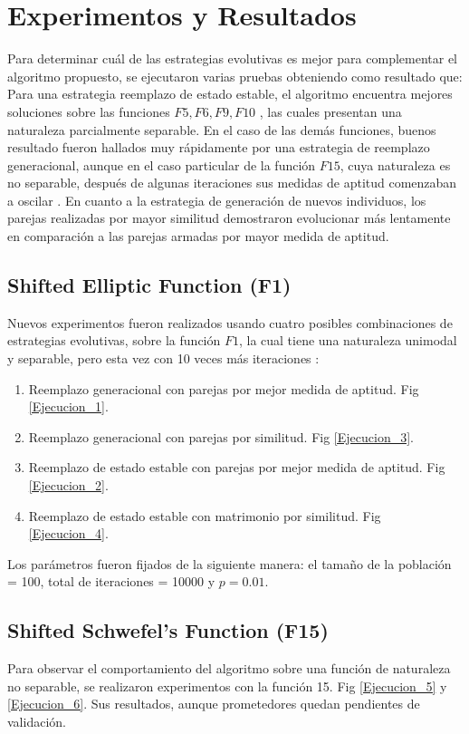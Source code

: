 \documentclass{llncs}
\begin{document}
\section{Experimentos y Resultados}
Para determinar cuál de las estrategias evolutivas es mejor para complementar el algoritmo propuesto, se ejecutaron varias pruebas obteniendo como resultado que:
Para una estrategia reemplazo de estado estable, el algoritmo encuentra mejores soluciones sobre las funciones ${F5,F6,F9,F10}$  \cite{IEEE:CEC}, las cuales presentan una naturaleza parcialmente separable.  En el caso de las demás funciones, buenos resultado fueron hallados muy rápidamente por una estrategia de reemplazo generacional, aunque en el caso particular de la función $F15$, cuya naturaleza es no separable, después de algunas iteraciones sus medidas de aptitud comenzaban a oscilar . 
En cuanto a la estrategia de generación de nuevos individuos, los parejas realizadas por mayor similitud demostraron evolucionar más lentamente en comparación a las parejas armadas por mayor medida de aptitud.

\subsection{Shifted Elliptic Function (F1) \cite{IEEE:CEC}}
Nuevos experimentos fueron realizados usando cuatro posibles combinaciones de estrategias evolutivas, sobre la función $F1$, la cual tiene una naturaleza unimodal y separable, pero esta vez con 10 veces más iteraciones :
\begin{enumerate}
\item Reemplazo generacional con parejas por mejor medida de aptitud. Fig \ref{Ejecucion_1}.
\item Reemplazo generacional con parejas por similitud. Fig \ref{Ejecucion_3}.
\item Reemplazo de estado estable con parejas por mejor medida de aptitud. Fig \ref{Ejecucion_2}.
\item Reemplazo de estado estable con matrimonio por similitud. Fig \ref{Ejecucion_4}. 
\end{enumerate}
Los parámetros fueron fijados de la siguiente manera:  el tamaño de la población = 100, total de iteraciones = 10000 y $p=0.01$.

\subsection{Shifted Schwefel’s Function (F15) \cite{IEEE:CEC}}
Para observar el comportamiento del algoritmo sobre una función de naturaleza no separable, se realizaron experimentos con la función 15. Fig \ref{Ejecucion_5} y \ref{Ejecucion_6}.
Sus resultados, aunque prometedores quedan pendientes de validación.
\end{document}

